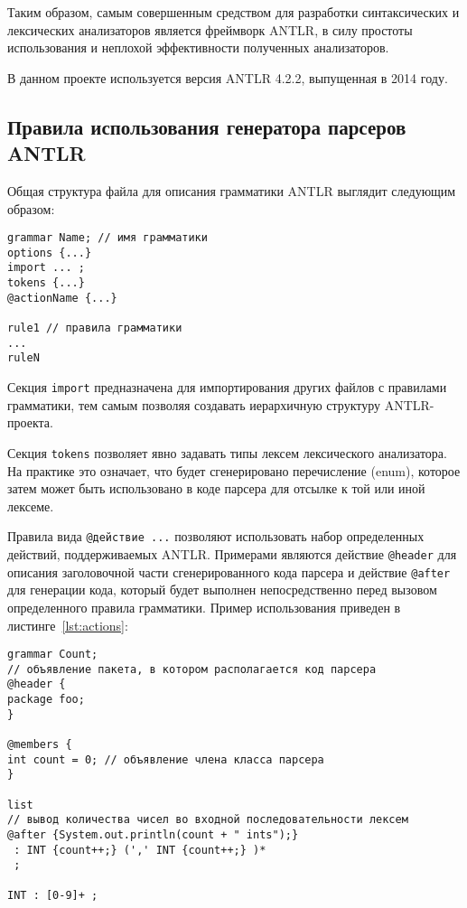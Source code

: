 Таким образом, самым совершенным средством для разработки синтаксических и
лексических анализаторов является фреймворк ANTLR, в силу простоты использования
и неплохой эффективности полученных анализаторов.

В данном проекте используется версия ANTLR 4.2.2, выпущенная в 2014 году.

\subsection{Правила использования генератора парсеров ANTLR}

Общая структура файла для описания грамматики ANTLR выглядит следующим образом:

\begin{lstlisting}[caption={Структура грамматики ANTLR}]
grammar Name; // имя грамматики
options {...}
import ... ;
tokens {...}
@actionName {...}

rule1 // правила грамматики
...
ruleN
\end{lstlisting}

Секция \texttt{import} предназначена для импортирования других файлов с
правилами грамматики, тем самым позволяя создавать иерархичную структуру
ANTLR-проекта.

Секция \texttt{tokens} позволяет явно задавать типы лексем лексического
анализатора. На практике это означает, что будет сгенерировано перечисление
(enum), которое затем может быть использовано в коде парсера для отсылке к той
или иной лексеме.

Правила вида \texttt{@действие {...}} позволяют использовать набор определенных
действий, поддерживаемых ANTLR. Примерами являются действие \texttt{@header} для
описания заголовочной части сгенерированного кода парсера и действие
\texttt{@after} для генерации кода, который будет выполнен непосредственно перед
вызовом определенного правила грамматики. Пример использования приведен в
листинге~\ref{lst:actions}:

\begin{lstlisting}[caption={Использование действий ANTLR}, label={lst:actions}]
grammar Count;
// объявление пакета, в котором располагается код парсера
@header {
package foo;
}

@members {
int count = 0; // объявление члена класса парсера
}

list
// вывод количества чисел во входной последовательности лексем
@after {System.out.println(count + " ints");}
 : INT {count++;} (',' INT {count++;} )*
 ;

INT : [0-9]+ ;
\end{lstlisting}


